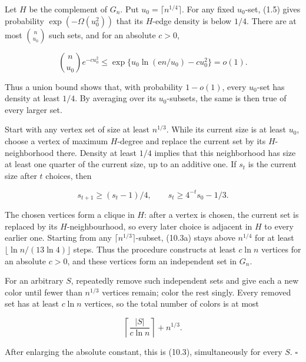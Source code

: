 \documentclass[11pt,reqno]{amsart}
\begin{document}
Let \(H\) be the complement of \(G_n\). Put
\(u_0=\lceil n^{1/4}\rceil\). For any fixed \(u_0\)-set, (1.5)
gives probability
\(\exp(-\Omega(u_0^2))\)
that its \(H\)-edge density is below \(1/4\). There are at
most \(\binom n{u_0}\) such sets, and for an absolute \(c>0\),

\[
 \binom n{u_0}e^{-cu_0^2}
 \le\exp\{u_0\ln(\mathrm{e} n/u_0)-cu_0^2\}=o(1).
\]

Thus a union bound shows that, with
probability \(1-o(1)\), every \(u_0\)-set has density at
least \(1/4\). By averaging over its \(u_0\)-subsets, the
same is then true of every larger set.

Start with any vertex set of size at least \(n^{1/3}\). While
its current size is at least \(u_0\), choose a vertex of maximum
\(H\)-degree and replace the current set by its
\(H\)-neighborhood there. Density at least \(1/4\) implies
that this neighborhood has size at least one quarter of the current
size, up to an additive one. If \(s_t\) is the current size after \(t\)
choices, then

\[
 s_{t+1}\ge(s_t-1)/4,\qquad s_t\ge4^{-t}s_0-1/3.         \tag{10.3a}
\]

The chosen vertices form a clique in \(H\): after a vertex is chosen, the
current set is replaced by its \(H\)-neighbourhood, so every later choice is
adjacent in \(H\) to every earlier one. Starting from any
\(\lceil n^{1/3}\rceil\)-subset, (10.3a) stays above \(n^{1/4}\) for at
least \(\lfloor {\ln n}/(13\ln4)\rfloor\) steps. Thus the procedure constructs
at least \(c{\ln n}\) vertices for an absolute \(c>0\), and these vertices form
an independent set in \(G_n\).

For an arbitrary \(S\), repeatedly remove such independent sets and
give each a new color until fewer than \(n^{1/3}\) vertices
remain; color the rest singly.  Every removed set has at least
\(c\ln n\) vertices, so the total number of colors is at most

\[
 \left\lceil\frac{|S|}{c\ln n}\right\rceil+n^{1/3}.
\]

After enlarging the absolute constant, this is (10.3), simultaneously for
every \(S\). \(\square\)
\end{document}
